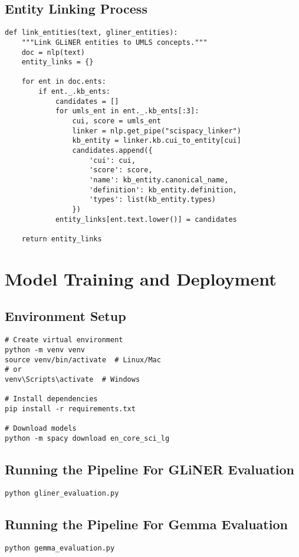 \subsection{Entity Linking Process}
\begin{verbatim}
def link_entities(text, gliner_entities):
    """Link GLiNER entities to UMLS concepts."""
    doc = nlp(text)
    entity_links = {}
    
    for ent in doc.ents:
        if ent._.kb_ents:
            candidates = []
            for umls_ent in ent._.kb_ents[:3]:
                cui, score = umls_ent
                linker = nlp.get_pipe("scispacy_linker")
                kb_entity = linker.kb.cui_to_entity[cui]
                candidates.append({
                    'cui': cui,
                    'score': score,
                    'name': kb_entity.canonical_name,
                    'definition': kb_entity.definition,
                    'types': list(kb_entity.types)
                })
            entity_links[ent.text.lower()] = candidates
    
    return entity_links
\end{verbatim}

\section{Model Training and Deployment}

\subsection{Environment Setup}
\begin{verbatim}
# Create virtual environment
python -m venv venv
source venv/bin/activate  # Linux/Mac
# or
venv\Scripts\activate  # Windows

# Install dependencies
pip install -r requirements.txt

# Download models
python -m spacy download en_core_sci_lg
\end{verbatim}

\subsection{Running the Pipeline For GLiNER Evaluation}
\begin{verbatim}
python gliner_evaluation.py
\end{verbatim}

\subsection{Running the Pipeline For Gemma Evaluation}
\begin{verbatim}
python gemma_evaluation.py
\end{verbatim}

